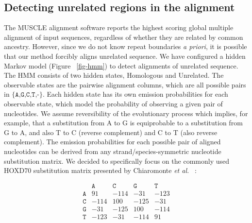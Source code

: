 \documentclass[12pt,journal,letterpaper,onecolumn, draftcls]{IEEEtran}
\begin{document}
\subsection{Detecting unrelated regions in the alignment}
\begin{figure*}[t!]
\centering {}
\caption[Hidden Markov model used to detect pairwise alignments of unrelated
sequence]%
{\textbf{Hidden Markov model used to detect pairwise alignments of unrelated
sequence.} The HMM has states which model alignment columns containing
homologous and unrelated sequence. Emission probabilities are extracted from the HOXD70 substitution matrix and correspond to alignment
columns, for example \texttt{AA} indicates A aligned to A.  gO
indicates gap-open and gE gap extend. Alignment columns are treated as
strand-symmetric, so that AC also indicates CA and the reverse
complements TG and GT.  The emission probabilities are adjusted to the G+C content of the input genome
as described in the text.  The values shown here correspond to a 47.5\% G+C genome.}
\label{fig-hmm}
\end{figure*}
The MUSCLE alignment software reports the highest scoring
global multiple alignment of input sequences, regardless of whether
they are related by common ancestry. However, since we do not know repeat boundaries \emph{a priori}, it is possible that our method forcibly aligns unrelated
sequence. We have configured a hidden Markov model (Figure
~\ref{fig-hmm}) to detect alignments of unrelated sequence. The HMM
consists of two hidden states, Homologous and Unrelated.  The
observable states are the pairwise alignment columns, which are all
possible pairs in $\texttt{{\{A,G,C,T,-\}}}$. Each hidden state has its own emission probabilities for each observable state, which model the probability of observing a given pair of nucleotides. We assume reversibility of the
evolutionary process which implies, for example, that a substitution from A to G is equiprobable to a substitution from G to A, and also T to C (reverse complement) and C to T (also reverse complement).   The emission probabilities for
each possible pair of aligned nucleotides can be derived from any strand/species-symmetric nucleotide substitution matrix.  We decided to specifically focus on the commonly used HOXD70 substitution matrix presented by Chiaromonte \textit{et al.}~\cite{hoxd} :
\begin{center}
\begin{equation}
\begin{array}{crrrr}
  & \texttt{A} & \texttt{C} & \texttt{G} & \texttt{T} \\
\texttt{A} & 91 & -114 & -31 & -123 \\
\texttt{C} & -114 & 100 & -125 & -31 \\
\texttt{G} & -31 & -125 & 100 & -114 \\
\texttt{T} & -123 & -31 & -114 & 91 \\ \end{array}
\end{equation}
\end{center}
\end{document}
